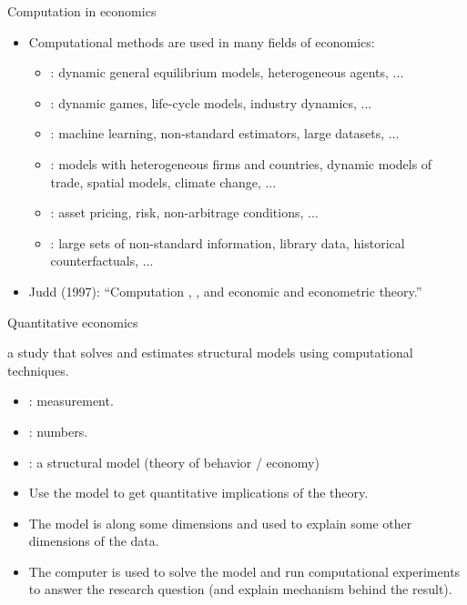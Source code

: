 \documentclass[11pt,xcolor={dvipsnames},aspectratio=159,hyperref={pdftex,pdfpagemode=UseNone,hidelinks,pdfdisplaydoctitle=true},usepdftitle=false]{beamer}
\begin{document}
\begin{frame}{Computation in economics}
\begin{itemize} \item Computational methods are used in many fields of economics:
\begin{itemize}
    \item {}: dynamic general equilibrium models, heterogeneous agents, ...
    \item {}: dynamic games, life-cycle models, industry dynamics, ...
    \item {}: machine learning, non-standard estimators, large datasets, ...
    \item {}: models with heterogeneous firms and countries, dynamic models of trade, spatial models, climate change, ...
    \item {}: asset pricing, risk, non-arbitrage conditions, ...
    \item {}: large sets of non-standard information, library data, historical counterfactuals, ...
\end{itemize}
\item Judd (1997): ``Computation , , and  economic and econometric theory.''
\end{itemize}
\end{frame}


\begin{frame}{Quantitative economics}

     a study that solves and estimates structural models using computational techniques.
    
    \vspace{0.3cm}
    
    \begin{itemize}
        \item {}: measurement.
        \item {}: numbers.
        \item {}: a structural model (theory of behavior / economy)
        \item Use the model to get quantitative implications of the theory.
        \item The model is  along some dimensions and used to explain some
        other dimensions of the data.
        \item The computer is used to solve the model and run
        computational experiments to answer the research question (and explain
        mechanism behind the result).
    \end{itemize}

\end{frame}
\end{document}

